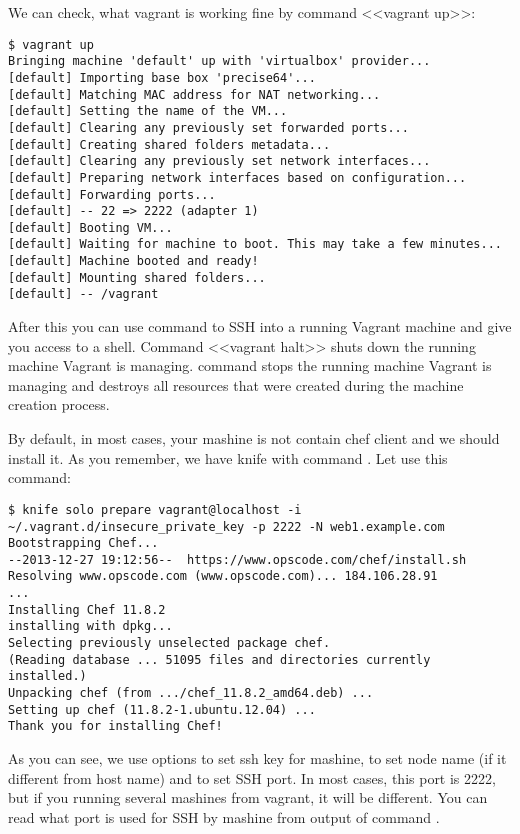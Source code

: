 We can check, what vagrant is working fine by command <<vagrant up>>:

\begin{lstlisting}[label=lst:my-cloud-vagrant4]
$ vagrant up
Bringing machine 'default' up with 'virtualbox' provider...
[default] Importing base box 'precise64'...
[default] Matching MAC address for NAT networking...
[default] Setting the name of the VM...
[default] Clearing any previously set forwarded ports...
[default] Creating shared folders metadata...
[default] Clearing any previously set network interfaces...
[default] Preparing network interfaces based on configuration...
[default] Forwarding ports...
[default] -- 22 => 2222 (adapter 1)
[default] Booting VM...
[default] Waiting for machine to boot. This may take a few minutes...
[default] Machine booted and ready!
[default] Mounting shared folders...
[default] -- /vagrant
\end{lstlisting}

After this you can use command  to SSH into a running Vagrant machine and give you access to a shell. Command <<vagrant halt>> shuts down the running machine Vagrant is managing.  command stops the running machine Vagrant is managing and destroys all resources that were created during the machine creation process.

By default, in most cases, your mashine is not contain chef client and we should install it. As you remember, we have knife with command . Let use this command:

\begin{lstlisting}[label=lst:my-cloud-vagrant5]
$ knife solo prepare vagrant@localhost -i ~/.vagrant.d/insecure_private_key -p 2222 -N web1.example.com
Bootstrapping Chef...
--2013-12-27 19:12:56--  https://www.opscode.com/chef/install.sh
Resolving www.opscode.com (www.opscode.com)... 184.106.28.91
...
Installing Chef 11.8.2
installing with dpkg...
Selecting previously unselected package chef.
(Reading database ... 51095 files and directories currently installed.)
Unpacking chef (from .../chef_11.8.2_amd64.deb) ...
Setting up chef (11.8.2-1.ubuntu.12.04) ...
Thank you for installing Chef!
\end{lstlisting}

As you can see, we use options  to set ssh key for mashine,  to set node name (if it different from host name) and  to set SSH port. In most cases, this port is 2222, but if you running several mashines from vagrant, it will be different. You can read what port is used for SSH by mashine from output of command .

